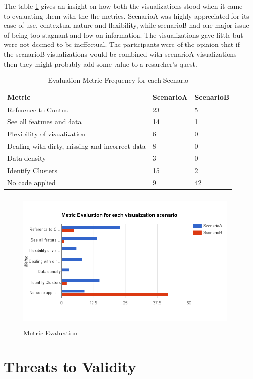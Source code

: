 \documentclass[seploa]{beavtex}
\begin{document}
The table \ref{tab:freq} gives an insight on how both the visualizations stood when it came to evaluating them with the the metrics. ScenarioA was highly appreciated for its ease of use, contextual nature and flexibility, while scenarioB had one major issue of being too stagnant and low on information. The visualizations gave little but were not deemed to be ineffectual. The participants were of the opinion that if the scenarioB visualizations would be combined with scenarioA visualizations then they might probably add some value to a resarcher's quest.

\begin{table}[H]
\centering
\begin{tabular}{ |p{5cm}|p{3cm}|p{3cm}|  }
 \hline
Metric & ScenarioA & ScenarioB\\
 \hline
 Reference to Context & 23 & 5\\ \hline
 See all features and data & 14 & 1\\ \hline
 Flexibility of visualization & 6 & 0\\ \hline
 Dealing with dirty, missing and incorrect data & 8 & 0\\ \hline
 Data density & 3 & 0\\ \hline
 Identify Clusters & 15 & 2\\ \hline
 No code applied & 9 & 42\\ 
 \hline
\end{tabular}
\caption{Evaluation Metric Frequency for each Scenario}
\label{tab:freq}
\end{table}

\begin{figure}[!ht]
\centering
\includegraphics[width=110mm,height=70mm]{metric.png}
\caption{Metric Evaluation}
\end{figure}

\chapter{Threats to Validity}
\end{document}
